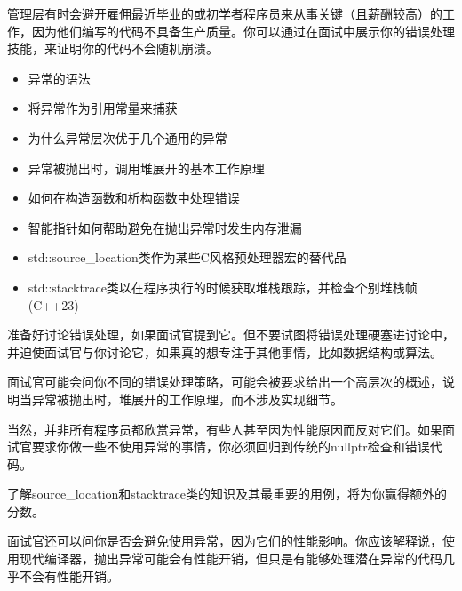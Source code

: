 
管理层有时会避开雇佣最近毕业的或初学者程序员来从事关键（且薪酬较高）的工作，因为他们编写的代码不具备生产质量。你可以通过在面试中展示你的错误处理技能，来证明你的代码不会随机崩溃。


\begin{itemize}
\item
异常的语法

\item
将异常作为引用常量来捕获

\item
为什么异常层次优于几个通用的异常

\item
异常被抛出时，调用堆展开的基本工作原理

\item
如何在构造函数和析构函数中处理错误

\item
智能指针如何帮助避免在抛出异常时发生内存泄漏

\item
std::source\_location类作为某些C风格预处理器宏的替代品

\item
std::stacktrace类以在程序执行的时候获取堆栈跟踪，并检查个别堆栈帧 (C++23)
\end{itemize}


准备好讨论错误处理，如果面试官提到它。但不要试图将错误处理硬塞进讨论中，并迫使面试官与你讨论它，如果真的想专注于其他事情，比如数据结构或算法。

面试官可能会问你不同的错误处理策略，可能会被要求给出一个高层次的概述，说明当异常被抛出时，堆展开的工作原理，而不涉及实现细节。

当然，并非所有程序员都欣赏异常，有些人甚至因为性能原因而反对它们。如果面试官要求你做一些不使用异常的事情，你必须回归到传统的nullptr检查和错误代码。

了解source\_location和stacktrace类的知识及其最重要的用例，将为你赢得额外的分数。

面试官还可以问你是否会避免使用异常，因为它们的性能影响。你应该解释说，使用现代编译器，抛出异常可能会有性能开销，但只是有能够处理潜在异常的代码几乎不会有性能开销。

